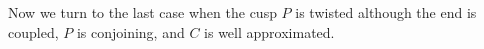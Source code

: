 \documentclass{amsart}
\theoremstyle{definition}
\begin{document}
%
%


Now we turn to the last case when the cusp $P$ is twisted although the end is coupled, $P$ is conjoining, and $C$ is well approximated.
 
\end{document}
